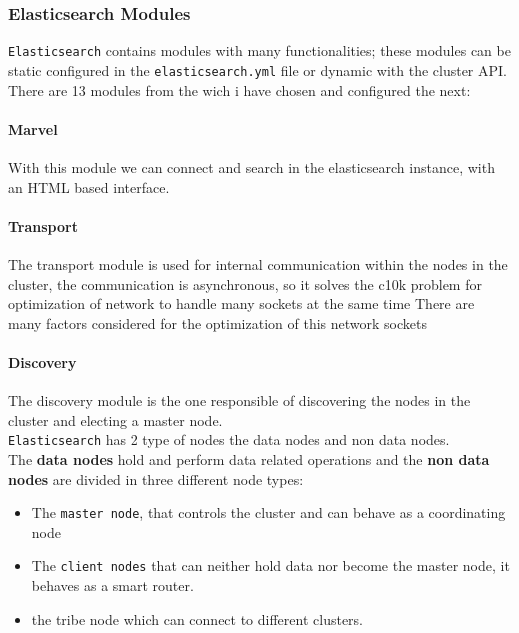 \subsubsection{Elasticsearch Modules}

\texttt{Elasticsearch} contains modules with many functionalities; these modules can be static configured in the \texttt{elasticsearch.yml} file or dynamic with the cluster API. There are 13 modules from the wich i have chosen and configured the next:
\paragraph{Marvel} With this module we can connect and search in the elasticsearch instance, with an HTML based interface.
\paragraph{Transport} The transport module is used for internal communication within the nodes in the cluster, the communication is asynchronous, so it solves the c10k problem for optimization of network to handle many sockets at the same time 
There are many factors considered for the optimization of this network sockets

\paragraph{Discovery} The discovery module is the one responsible of discovering the nodes in the cluster and electing a master node.
\\

\texttt{Elasticsearch}  has 2 type of nodes the data nodes and non data nodes.
\\

The \textbf{data nodes} hold and perform data related operations and the \textbf{non data nodes} are divided in three different node types:
\begin{itemize}
\item The \texttt{master node}, that controls the cluster and can behave as a coordinating node
\item The \texttt{client nodes} that can neither hold data nor become the master node, it behaves as a smart router.
\item the {tribe node} which can connect to different clusters.
\end{itemize}
